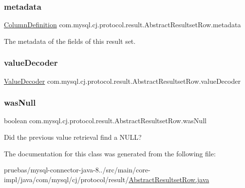 \subsubsection{\texorpdfstring{metadata}{metadata}}
{\footnotesize\ttfamily \mbox{\hyperlink{interfacecom_1_1mysql_1_1cj_1_1protocol_1_1_column_definition}{Column\+Definition}} com.\+mysql.\+cj.\+protocol.\+result.\+Abstract\+Resultset\+Row.\+metadata\hspace{0.3cm}{\ttfamily [protected]}}

The metadata of the fields of this result set. \mbox{\label{classcom_1_1mysql_1_1cj_1_1protocol_1_1result_1_1_abstract_resultset_row_a62b113b0142a35b7962695b43b5b8e22}} 
\subsubsection{\texorpdfstring{value\+Decoder}{valueDecoder}}
{\footnotesize\ttfamily \mbox{\hyperlink{interfacecom_1_1mysql_1_1cj_1_1protocol_1_1_value_decoder}{Value\+Decoder}} com.\+mysql.\+cj.\+protocol.\+result.\+Abstract\+Resultset\+Row.\+value\+Decoder\hspace{0.3cm}{\ttfamily [protected]}}

\mbox{\label{classcom_1_1mysql_1_1cj_1_1protocol_1_1result_1_1_abstract_resultset_row_a26e909a488abbe6e233b88a5f7e72dab}} 
\subsubsection{\texorpdfstring{was\+Null}{wasNull}}
{\footnotesize\ttfamily boolean com.\+mysql.\+cj.\+protocol.\+result.\+Abstract\+Resultset\+Row.\+was\+Null\hspace{0.3cm}{\ttfamily [protected]}}

Did the previous value retrieval find a N\+U\+LL? 

The documentation for this class was generated from the following file\+:\begin{DoxyCompactItemize}
\item 
pruebas/mysql-\/connector-\/java-\/8../src/main/core-\/impl/java/com/mysql/cj/protocol/result/\mbox{\hyperlink{_abstract_resultset_row_8java}{Abstract\+Resultset\+Row.\+java}}\end{DoxyCompactItemize}
